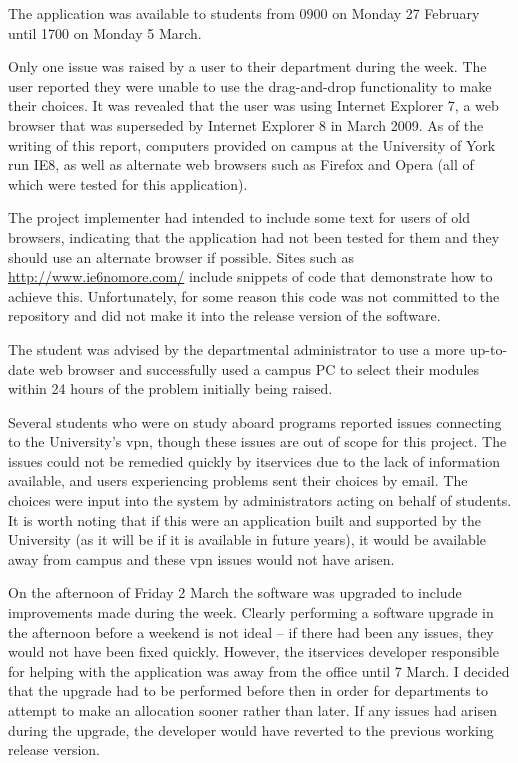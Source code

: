 The application was available to students from 0900 on Monday 27 February
until 1700 on Monday 5 March. %


Only one issue was raised by a user to their department during the week. The
user reported they were unable to use the drag-and-drop functionality to make
their choices. It was revealed that the user was using Internet Explorer 7, a
web browser that was superseded by Internet Explorer 8 in March 2009. As of
the writing of this report, computers provided on campus at the University of
York run IE8, as well as alternate web browsers such as Firefox and Opera (all
of which were tested for this application).

The project implementer had intended to include some text for users of old
browsers, indicating that the application had not been tested for them and
they should use an alternate browser if possible. Sites such as
\url{http://www.ie6nomore.com/} include snippets of code that demonstrate how
to achieve this. Unfortunately, for some reason this code was not committed to
the repository and did not make it into the release version of the software.

The student was advised by the departmental administrator to use a more
up-to-date web browser and successfully used a campus PC to select their
modules within 24 hours of the problem initially being raised.

Several students who were on study aboard programs reported issues connecting
to the University's \gls{vpn}, though these issues are out of scope for this
project. The issues could not be remedied quickly by \gls{itservices} due to
the lack of information available, and users experiencing problems sent their
choices by email. The choices were input into the system by administrators
acting on behalf of students. It is worth noting that if this were an
application built and supported by the University (as it will be if it is
available in future years), it would be available away from campus and these
\gls{vpn} issues would not have arisen.

On the afternoon of Friday 2 March the software was upgraded to include
improvements made during the week. Clearly performing a software upgrade in
the afternoon before a weekend is not ideal -- if there had been any issues,
they would not have been fixed quickly. However, the \gls{itservices}
developer responsible for helping with the application was away from the
office until 7 March. I decided that the upgrade had to be performed before
then in order for departments to attempt to make an allocation sooner rather
than later. If any issues had arisen during the upgrade, the developer would
have reverted to the previous working release version.

